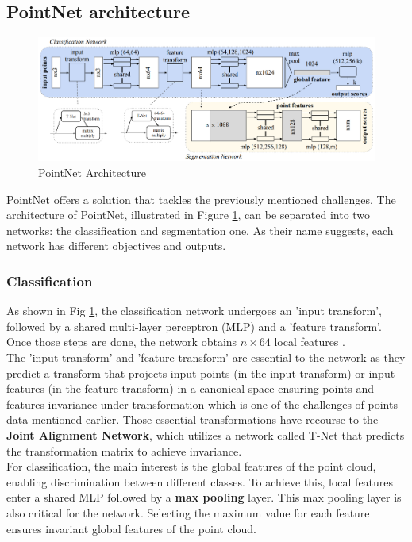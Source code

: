 \subsection{PointNet architecture}
\begin{figure}[ht]
    \centering
    \includegraphics[width=\textwidth]{Img/05_Pointnet.png}
    \caption{PointNet Architecture \cite{PointNet}}
    \label{fig:Pointnet1}
\end{figure}
PointNet offers a solution that tackles the previously mentioned challenges. The architecture of PointNet, illustrated in Figure \ref{fig:Pointnet1}, can be separated into two networks: the classification and segmentation one. As their name suggests, each network has different objectives and outputs. \\
\subsubsection{Classification}

As shown in Fig \ref{fig:Pointnet1}, the classification network undergoes an 'input transform', followed by a shared multi-layer perceptron (MLP) and a 'feature transform'. Once those steps are done, the network obtains $n\times 64$ local features .\\

The 'input transform' and 'feature transform' are essential to the network as they predict a transform that projects input points (in the input transform) or input features (in the feature transform) in a canonical space ensuring points and features invariance under transformation which is one of the challenges of points data mentioned earlier. Those essential transformations have recourse to the \textbf{Joint Alignment Network}, which utilizes a network called T-Net that predicts the transformation matrix to achieve invariance.\\

For classification, the main interest is the global features of the point cloud, enabling discrimination between different classes. To achieve this, local features enter a shared MLP followed by a \textbf{max pooling} layer. This max pooling layer is also critical for the network. Selecting the maximum value for each feature ensures invariant global features of the point cloud. \\

